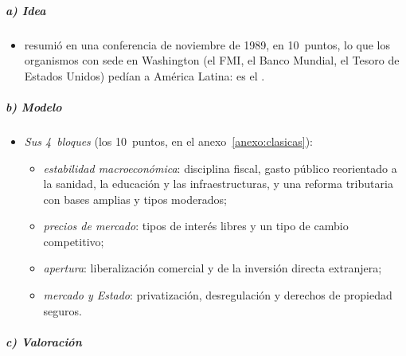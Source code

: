 \documentclass[11pt]{article}
\begin{document}
\subparagraph{a) Idea}

\begin{itemize}
\item \textcite{Williamson1990} resumió en una conferencia de noviembre de 1989, en 10~puntos, lo que los organismos con sede en Washington (el FMI, el Banco Mundial, el Tesoro de Estados Unidos) pedían a América Latina: es el .
\end{itemize}

\subparagraph{b) Modelo}

\begin{itemize}
\item \emph{Sus 4~bloques} (los 10~puntos, en el anexo~\ref{anexo:clasicas}):
  \begin{itemize}
  \item \emph{estabilidad macroeconómica}: disciplina fiscal, gasto público reorientado a la sanidad, la educación y las infraestructuras, y una reforma tributaria con bases amplias y tipos moderados;
  \item \emph{precios de mercado}: tipos de interés libres y un tipo de cambio competitivo;
  \item \emph{apertura}: liberalización comercial y de la inversión directa extranjera;
  \item \emph{mercado y Estado}: privatización, desregulación y derechos de propiedad seguros.
  \end{itemize}
\end{itemize}

\subparagraph{c) Valoración}
\end{document}
